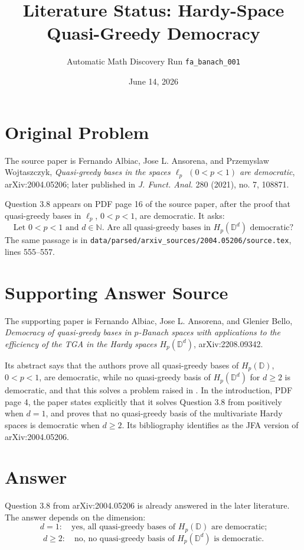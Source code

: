 \documentclass[11pt]{article}
\title{Literature Status: Hardy-Space Quasi-Greedy Democracy}
\author{Automatic Math Discovery Run \texttt{fa\_banach\_001}}
\date{June 14, 2026}
\begin{document}
\maketitle

\section*{Original Problem}

The source paper is Fernando Albiac, Jose L. Ansorena, and Przemyslaw
Wojtaszczyk, \emph{Quasi-greedy bases in the spaces \(\ell_p\)
\((0<p<1)\) are democratic}, arXiv:2004.05206; later published in
\emph{J. Funct. Anal.} 280 (2021), no. 7, 108871.

Question 3.8 appears on PDF page 16 of the source paper, after the proof that
quasi-greedy bases in \(\ell_p\), \(0<p<1\), are democratic. It asks:
\[
\text{Let }0<p<1\text{ and }d\in\mathbb N.\text{ Are all quasi-greedy bases in }
H_p(\mathbb D^d)\text{ democratic?}
\]
The same passage is in
\texttt{data/parsed/arxiv\_sources/2004.05206/source.tex}, lines 555--557.

\section*{Supporting Answer Source}

The supporting paper is Fernando Albiac, Jose L. Ansorena, and Glenier Bello,
\emph{Democracy of quasi-greedy bases in \(p\)-Banach spaces with applications
to the efficiency of the TGA in the Hardy spaces \(H_p(\mathbb D^d)\)},
arXiv:2208.09342.

Its abstract says that the authors prove all quasi-greedy bases of
\(H_p(\mathbb D)\), \(0<p<1\), are democratic, while no quasi-greedy basis of
\(H_p(\mathbb D^d)\) for \(d\ge 2\) is democratic, and that this solves a
problem raised in \cite{AAW2021}. In the introduction, PDF page 4, the paper
states explicitly that it solves Question 3.8 from \cite{AAW2021} positively
when \(d=1\), and proves that no quasi-greedy basis of the multivariate Hardy
spaces is democratic when \(d\ge2\). Its bibliography identifies
\cite{AAW2021} as the JFA version of arXiv:2004.05206.

\section*{Answer}

Question 3.8 from arXiv:2004.05206 is already answered in the later literature.
The answer depends on the dimension:
\[
d=1:\quad \text{yes, all quasi-greedy bases of }H_p(\mathbb D)\text{ are democratic;}
\]
\[
d\ge2:\quad \text{no, no quasi-greedy basis of }H_p(\mathbb D^d)\text{ is democratic.}
\]
\end{document}
